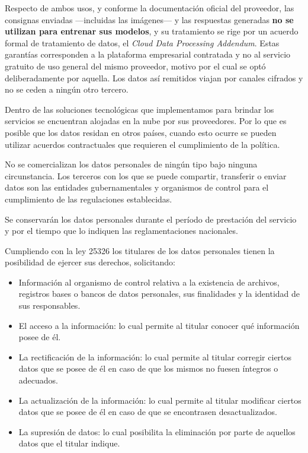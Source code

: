 \documentclass[a4paper,12pt]{article}
\begin{document}
    \par Respecto de ambos usos, y conforme la documentación oficial del proveedor, las consignas enviadas —incluidas las imágenes— y las respuestas generadas \textbf{no se utilizan para entrenar sus modelos}, y su tratamiento se rige por un acuerdo formal de tratamiento de datos, el \textit{Cloud Data Processing Addendum}\cite{GoogleCloudDataGovernance}. Estas garantías corresponden a la plataforma empresarial contratada y no al servicio gratuito de uso general del mismo proveedor, motivo por el cual se optó deliberadamente por aquella. Los datos así remitidos viajan por canales cifrados y no se ceden a ningún otro tercero.
    \par Dentro de las soluciones tecnológicas que implementamos para brindar los servicios se encuentran alojadas en la nube por sus proveedores. Por lo que es posible que los datos residan en otros países, cuando esto ocurre se pueden utilizar acuerdos contractuales que requieren el cumplimiento de la política.
    \par No se comercializan los datos personales de ningún tipo bajo ninguna circunstancia. Los terceros con los que se puede compartir, transferir o enviar datos son las entidades gubernamentales y organismos de control para el cumplimiento de las regulaciones establecidas.
    \par Se conservarán los datos personales durante el período de prestación del servicio y por el tiempo que lo indiquen las reglamentaciones nacionales.
    \par Cumpliendo con la ley 25326 \cite{Ley25326} los titulares de los datos personales tienen la posibilidad de ejercer sus derechos, solicitando:
    \begin{itemize}
        \item Información al organismo de control relativa a la existencia de archivos, registros bases o bancos de datos personales, sus finalidades y la identidad de sus responsables.
        \item El acceso a la información: lo cual permite al titular conocer qué información posee de él.
        \item La rectificación de la información: lo cual permite al titular corregir ciertos datos que se posee de él en caso de que los mismos no fuesen íntegros o adecuados.
        \item La actualización de la información: lo cual permite al titular modificar ciertos datos que se posee de él en caso de que se encontrasen desactualizados.
        \item La supresión de datos: lo cual posibilita la eliminación por parte de aquellos datos que el titular indique.
    \end{itemize}
\end{document}
